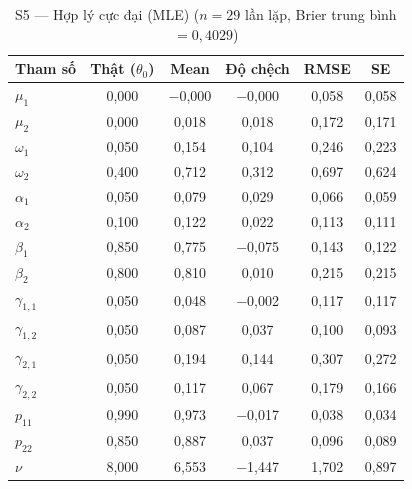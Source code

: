 \documentclass[11pt,a4paper]{article}
\begin{document}
\begin{table}[H]\centering\scriptsize
\caption{S5 --- Hợp lý cực đại (MLE) ($n=29$ lần lặp, Brier trung bình $=0{,}4029$)}
\begin{tabularx}{\textwidth}{l C C C C C}
\toprule
\textbf{Tham số} & \textbf{Thật ($\theta_0$)} & \textbf{Mean} & \textbf{Độ chệch} & \textbf{RMSE} & \textbf{SE} \\
\midrule
$\mu_1$ & 0{,}000 & $-$0{,}000 & $-$0{,}000 & 0{,}058 & 0{,}058 \\
$\mu_2$ & 0{,}000 & 0{,}018 & 0{,}018 & 0{,}172 & 0{,}171 \\
$\omega_1$ & 0{,}050 & 0{,}154 & 0{,}104 & 0{,}246 & 0{,}223 \\
$\omega_2$ & 0{,}400 & 0{,}712 & 0{,}312 & 0{,}697 & 0{,}624 \\
$\alpha_1$ & 0{,}050 & 0{,}079 & 0{,}029 & 0{,}066 & 0{,}059 \\
$\alpha_2$ & 0{,}100 & 0{,}122 & 0{,}022 & 0{,}113 & 0{,}111 \\
$\beta_1$ & 0{,}850 & 0{,}775 & $-$0{,}075 & 0{,}143 & 0{,}122 \\
$\beta_2$ & 0{,}800 & 0{,}810 & 0{,}010 & 0{,}215 & 0{,}215 \\
$\gamma_{1,1}$ & 0{,}050 & 0{,}048 & $-$0{,}002 & 0{,}117 & 0{,}117 \\
$\gamma_{1,2}$ & 0{,}050 & 0{,}087 & 0{,}037 & 0{,}100 & 0{,}093 \\
$\gamma_{2,1}$ & 0{,}050 & 0{,}194 & 0{,}144 & 0{,}307 & 0{,}272 \\
$\gamma_{2,2}$ & 0{,}050 & 0{,}117 & 0{,}067 & 0{,}179 & 0{,}166 \\
$p_{11}$ & 0{,}990 & 0{,}973 & $-$0{,}017 & 0{,}038 & 0{,}034 \\
$p_{22}$ & 0{,}850 & 0{,}887 & 0{,}037 & 0{,}096 & 0{,}089 \\
$\nu$ & 8{,}000 & 6{,}553 & $-$1{,}447 & 1{,}702 & 0{,}897 \\
\bottomrule
\end{tabularx}
\end{table}
\end{document}
